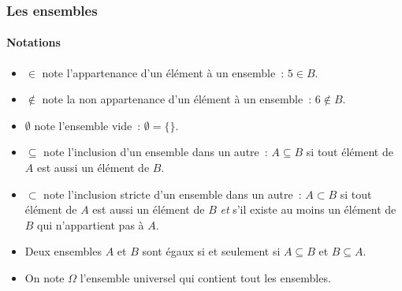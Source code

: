 \documentclass[10pt,notheorems]{beamer}
\theoremstyle{plain}
\theoremstyle{definition} %
\begin{document}
\begin{frame}
  \frametitle{Les ensembles}
  \framesubtitle{Notations}
  \hypertarget{slide_ensembles_notations_definitions_2}{}

  \begin{itemize}

    \item $\in$ note l'appartenance d'un élément à un ensemble~: $5\in B$.\newline

    \item $\notin$ note la non appartenance d'un élément à un ensemble~: $6\notin B$.\newline

    \item $\emptyset$ note l'ensemble vide~: $\emptyset = \{\}$.\newline

    \item $\subseteq$ note l'inclusion d'un ensemble dans un autre~: $ A \subseteq B $ si tout élément de $A$ est aussi un élément de $B$.\newline

    \item $\subset$ note l'inclusion stricte d'un ensemble dans un autre~: $ A \subset B $ si tout élément de $A$ est aussi un élément de $B$ \emph{et} s'il existe au moins un élément de $B$ qui n'appartient pas à $A$.\newline

    \item Deux ensembles $A$ et $B$ sont égaux si et seulement si $A\subseteq B$ et $B\subseteq A$.\newline

    \item On note $\Omega$ l'ensemble universel qui contient tout les ensembles.

  \end{itemize}

\end{frame}
\end{document}
